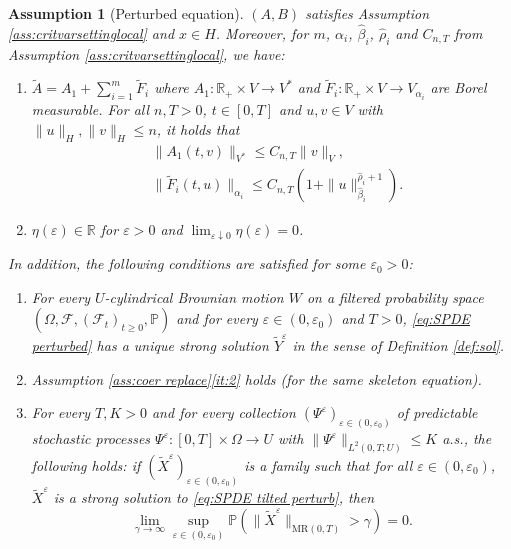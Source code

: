 \documentclass{amsart}
\renewcommand{\MR}{\mathrm{MR}}
\newcommand{\<}{\langle}
\newcommand{\?}{\rangle}
\newcommand{\col}{\colon}
\newcommand{\bphieps}{\Psi^{\eps}}
\theoremstyle{plain}
\theoremstyle{remark}
\theoremstyle{plain}
\newtheorem{assumption}[theorem]{Assumption}
\numberwithin{equation}{section}
\def\R{{\mathbb R}}
\renewcommand{\P}{\mathbb{P}}
\newcommand{\Om}{\Omega}
\newcommand{\eps}{\varepsilon}
\begin{document}
\begin{assumption}[Perturbed equation]\label{ass:perturb2} 
$(A,B)$  satisfies  Assumption  \ref{ass:critvarsettinglocal} and $x\in H$.  
Moreover, for $m$, $\alpha_i$, $\hat{\beta}_i$, $\hat{\rho}_i$ and $C_{n,T}$ from Assumption \ref{ass:critvarsettinglocal}, we have:  
\begin{enumerate}[label=\textit{(\roman*)},ref=\textit{(\roman*)}] 
\item\label{it:tildeA} $\tilde{A}=A_1+\sum_{i=1}^m\tilde{F}_i$ where  
${A}_1\col \R_+\times V\to V^*$ and $\tilde{F}_i\col \R_+\times V\to V_{\alpha_i}$ are Borel measurable. For all  $n,T>0$, $t\in[0,T]$ and $u,v\in V$ with $\|u\|_H,\|v\|_H\leq n$, it holds that
\begin{align*}
   &\|A_1(t,v)\|_{V^*}\leq C_{n,T}\|v\|_{V},\\ 
&\|\tilde{F}_i(t,u)\|_{\alpha_i}\leq C_{n,T} (1+\|u\|_{\hat{\beta}_i}^{\hat{\rho}_i+1}). 
\end{align*}
\item\label{it:eta} $\eta(\eps)\in\R$ for $\eps>0$ and  $\lim_{\eps\downarrow0}\eta(\eps)=0$. 
\end{enumerate} 
In addition, the following conditions are satisfied for some $\eps_0>0$:
\begin{enumerate}[label=\textit{( $\widetilde{\!\!\text{\Roman*}}$)},ref=\textit{( $\widetilde{\!\!\text{\Roman*}}$)}]
  \item \label{it:1pert} For every $U$-cylindrical Brownian motion $W$ on a filtered probability space $(\Om,\mathcal{F},(\mathcal{F}_t)_{t\geq 0},\P)$  and for every $\eps\in (0,\eps_0)$ and $T>0$, \eqref{eq:SPDE perturbed} has a unique strong solution $\tilde{Y}^\eps$ in the sense of Definition \ref{def:sol}. 
  \item \label{it:2pert} Assumption \ref{ass:coer replace}\ref{it:2} holds (for the same skeleton equation). 
\item \label{it:3pert} For every $T,K>0$ and for every collection $(\bphieps)_{\eps\in(0,\eps_0)}$ of predictable stochastic processes $\bphieps\col [0,T]\times \Om\to U$ with   $\|\bphieps\|_{L^2(0,T;U)}\leq K$ a.s., the following holds: 
if $(\tilde{X}^\eps)_{\eps\in(0,\eps_0)}$ is a family such that for all $\eps\in(0,\eps_0)$, $\tilde{X}^\eps$ is a strong solution to \eqref{eq:SPDE tilted perturb}, then 
\begin{equation*} 
    \lim_{\gamma\to\infty}\sup_{\eps\in(0,\eps_0)}\P(\|\tilde{X}^\eps\|_{\MR(0,T)}>\gamma)=0. 
\end{equation*}
\end{enumerate} 
\end{assumption}
\end{document}
